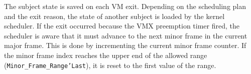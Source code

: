 The subject state is saved on each VM exit. Depending on the scheduling plan and
the exit reason, the state of another subject is loaded by the kernel scheduler.
If the exit occurred because the VMX preemption timer fired, the scheduler is
aware that it must advance to the next minor frame in the current major frame.
This is done by incrementing the current minor frame counter. If the minor frame
index reaches the upper end of the allowed range
(\texttt{Minor\_Frame\_Range'Last}), it is reset to the first value of the
range.
